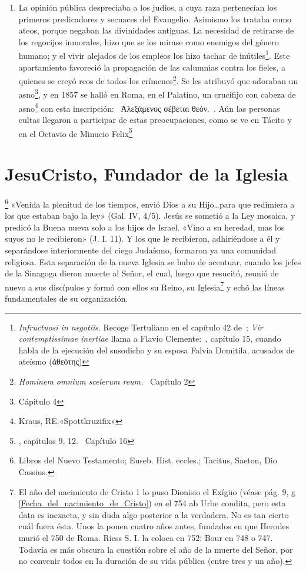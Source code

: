 \raggedbottom{} \documentclass[12pt, a4paper, openany]{book} %
\begin{document}
\begin{enumerate}
  \item La opinión pública despreciaba a los judíos, a cuya raza pertenecían los primeros predicadores y secuaces del Evangelio. Asimismo los trataba como ateos, porque negaban las divinidades antiguas. La necesidad de retirarse de los regocijos inmorales, hizo que se los mirase como enemigos del género humano; y el vivir alejados de los empleos los hizo tachar de inútiles\textdagger\footnote{\textit{Infructuosi in negotiis}. Recoge Tertuliano en el capítulo 42 de~\cite{Tertuliano197Apologeticum}; \textit{Vir contemptissimae inertiae} llama a Flavio Clemente:~\cite{Suetonio121DeVitaCaesarum}, capítulo 15, cuando habla de la ejecución del susodicho y su esposa Falvia Domitila, acusados de ateísmo (\textgreek{ἀθεότης})}. Este apartamiento favoreció la propagación de las calumnias contra los fieles, a quienes se creyó reos de todos los crímenes\textdagger\footnote{\textit{Hominem omnium scelerum reum.}~\cite{Tertuliano197Apologeticum} Capítulo 2}. Se les atribuyó que adoraban un asno\footnote{\cite{Tertuliano197Apologeticum} Cápitulo 4},  y en 1857 se halló en Roma, en el Palatino, un crucifijo con cabeza de asno\footnote{Kraus, RE.\@ «Spottkruzifix»} con esta inscripción: \guillemetleft\ \textgreek{Ἀλεξάμενος σέβεται θεόν.}\guillemetright\ . Aún las personas cultas llegaron a participar de estas preocupaciones, como se ve en Tácito y en el Octavio de Minucio Felix\footnote{\cite{Cecilio197Minucio}, capítulos 9, 12.~\cite{Tertuliano197Apologeticum} Capítulo 16}
\end{enumerate}
\section{JesuCristo, Fundador de la Iglesia}
\footnote{Libros del Nuevo Testamento; Euseb. Hist. eccles.; Tacitus, Saeton, Dio Cassius.} «Venida la plenitud de los tiempos, envió Dios a su Hijo\ldots para que redimiera a los que estaban bajo la ley» (Gal. IV, 4/5). Jesús se sometió a la Ley mosaica, y predicó la Buena nueva solo a los hijos de Israel. «Vino a su heredad, mas los suyos no le recibieron» (J. I. 11). Y los que le recibieron, adhiriéndose a él y separándose interiormente del ciego Judaísmo, formaron ya una comunidad religiosa. Esta separación de la nueva Iglesia se hubo de acentuar, cuando los jefes de la Sinagoga dieron muerte al Señor, el cual, luego que resucitó, reunió de nuevo a sus discípulos y formó con ellos su Reino, su Iglesia\textdagger\footnote{El año del nacimiento de Cristo 1 lo puso Dionisio el Exígüo (véase pág. 9, g \ref{Fecha_del_nacimiento_de_Cristo}) en el 754 ab Urbe condita, pero esta data es inexacta, y sin duda algo posterior a la verdadera. No es tan cierto cuál fuera ésta. Unos la ponen cuatro años antes, fundados en que Herodes murió el 750 de Roma. Riess S. I. la coloca en 752; Bour en 748 o 747. Todavía es más obscura la cuestión sobre el año de la muerte del Señor, por no convenir todos en la duración de su vida pública (entre tres y un año).} y echó las líneas fundamentales de su organización.
\end{document}
